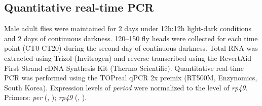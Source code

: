 \subsection*{Quantitative real-time PCR}

Male adult flies were maintained for 2 days under 12h:12h light-dark conditions and 2 days of continuous darkness.
120--150 fly heads were collected for each time point (CT0-CT20) during the second day of continuous darkness.
Total RNA was extracted using Trizol (Invitrogen) and reverse transcribed using the RevertAid First Strand cDNA Synthesis Kit (Thermo Scientific).
Quantitative real-time PCR was performed using the TOPreal qPCR 2x premix (RT500M, Enzynomics, South Korea).
Expression levels of \emph{period} were normalized to the level of \emph{rp49}.
Primers: \emph{per} (, ); \emph{rp49} (, ).
